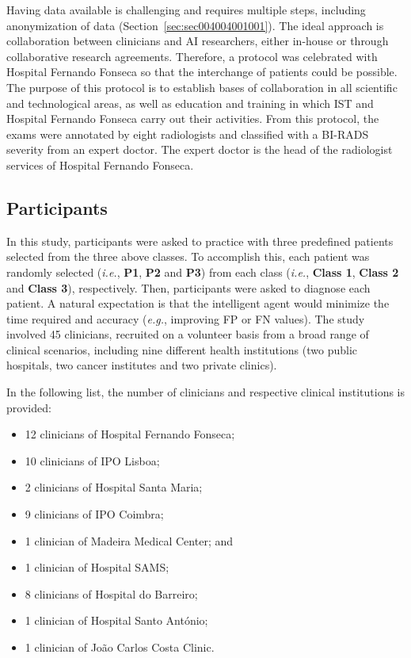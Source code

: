 Having data available is challenging and requires multiple steps, including anonymization of data (Section~\ref{sec:sec004004001001}).
The ideal approach is collaboration between clinicians and \ac{AI} researchers, either in-house or through collaborative research agreements.
Therefore, a protocol was celebrated with Hospital Fernando Fonseca so that the interchange of patients could be possible.
The purpose of this protocol is to establish bases of collaboration in all scientific and technological areas, as well as education and training in which \ac{IST} and Hospital Fernando Fonseca carry out their activities.
From this protocol, the exams were annotated by eight radiologists and classified with a \ac{BI-RADS} severity from an expert doctor.
The expert doctor is the head of the radiologist services of Hospital Fernando Fonseca.

\subsection{Participants}
\label{sec:sec005005001}

In this study, participants were asked to practice with three predefined patients selected from the three above classes.
To accomplish this, each patient was randomly selected ({\it i.e.}, {\bf P1}, {\bf P2} and {\bf P3}) from each class ({\it i.e.}, {\bf Class 1}, {\bf Class 2} and {\bf Class 3}), respectively.
Then, participants were asked to diagnose each patient.
A natural expectation is that the intelligent agent would minimize the time required and accuracy ({\it e.g.}, improving \ac{FP} or \ac{FN} values).
The study involved 45 clinicians, recruited on a volunteer basis from a broad range of clinical scenarios, including nine different health institutions (two public hospitals, two cancer institutes and two private clinics).

\hfill

\noindent
In the following list, the number of clinicians and respective clinical institutions is provided:

\begin{multicols}{2}
\begin{itemize}
\item 12 clinicians of Hospital Fernando Fonseca; %
\item 10 clinicians of IPO Lisboa; %
\item 2 clinicians of Hospital Santa Maria; %
\item 9 clinicians of IPO Coimbra; %
\item 1 clinician of Madeira Medical Center; and %
\item 1 clinician of Hospital SAMS; %
\item 8 clinicians of Hospital do Barreiro; %
\item 1 clinician of Hospital Santo Ant\'{o}nio; %
\item 1 clinician of Jo\~{a}o Carlos Costa Clinic. %
\end{itemize}
\end{multicols}

